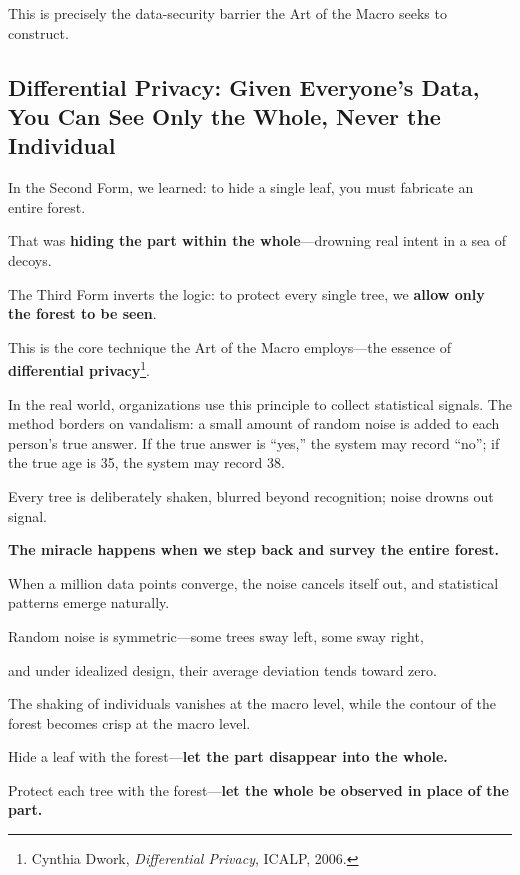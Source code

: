 This is precisely the data-security barrier the Art of the Macro seeks to construct.

\subsection{Differential Privacy: Given Everyone's Data, You Can See Only the Whole, Never the Individual}

In the Second Form, we learned: to hide a single leaf, you must fabricate an entire forest.

That was \textbf{hiding the part within the whole}---drowning real intent in a sea of decoys.

The Third Form inverts the logic: to protect every single tree, we \textbf{allow only the forest to be seen}.

This is the core technique the Art of the Macro employs---the essence of \textbf{differential privacy}\footnote{Cynthia Dwork, \textit{Differential Privacy}, ICALP, 2006.}.

\vspace{1em}

In the real world, organizations use this principle to collect statistical signals. The method borders on vandalism: a small amount of random noise is added to each person's true answer. If the true answer is ``yes,'' the system may record ``no''; if the true age is 35, the system may record 38.

Every tree is deliberately shaken, blurred beyond recognition; noise drowns out signal.

\vspace{1em}

\textbf{The miracle happens when we step back and survey the entire forest.}

When a million data points converge, the noise cancels itself out, and statistical patterns emerge naturally.

Random noise is symmetric---some trees sway left, some sway right,

and under idealized design, their average deviation tends toward zero.

The shaking of individuals vanishes at the macro level, while the contour of the forest becomes crisp at the macro level.

\begin{importantbox}
Hide a leaf with the forest---\textbf{let the part disappear into the whole.}

Protect each tree with the forest---\textbf{let the whole be observed in place of the part.}
\end{importantbox}

